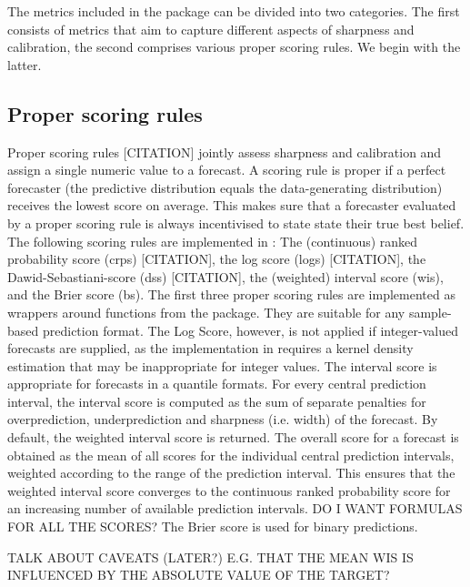 \documentclass[article]{jss}
\begin{document}



The metrics included in the  package can be divided into two categories. The first consists of metrics that aim to capture different aspects of sharpness and calibration, the second comprises various proper scoring rules. We begin with the latter. 

\subsection{Proper scoring rules}

Proper scoring rules [CITATION] jointly assess sharpness and calibration and assign a single numeric value to a forecast. A scoring rule is proper if a perfect forecaster (the predictive distribution equals the data-generating distribution) receives the lowest score on average. This makes sure that a forecaster evaluated by a proper scoring rule is always incentivised to state state their true best belief. The following scoring rules are implemented in : The (continuous) ranked probability score (crps) [CITATION], the log score (logs) [CITATION], the Dawid-Sebastiani-score (dss) [CITATION], the (weighted) interval score (wis), and the Brier score (bs). The first three proper scoring rules are implemented as wrappers around functions from the  package. They are suitable for any sample-based prediction format. The Log Score, however, is not applied if integer-valued forecasts are supplied, as the implementation in  requires a kernel density estimation that may be inappropriate for integer values. The interval score is appropriate for forecasts in a quantile formats. For every central prediction interval, the interval score is computed as the sum of separate penalties for overprediction, underprediction and sharpness (i.e. width) of the forecast. By default, the weighted interval score is returned. The overall score for a forecast is obtained as the mean of all scores for the individual central prediction intervals, weighted according to the range of the prediction interval. This ensures that the weighted interval score converges to the continuous ranked probability score for an increasing number of available prediction intervals. 
DO I WANT FORMULAS FOR ALL THE SCORES? The Brier score is used for binary predictions. 

TALK ABOUT CAVEATS (LATER?) E.G. THAT THE MEAN WIS IS INFLUENCED BY THE ABSOLUTE VALUE OF THE TARGET?
\end{document}
